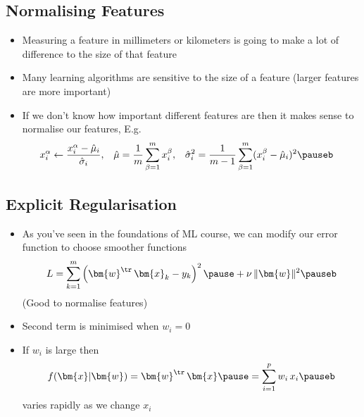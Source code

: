 
\begin{slide}
\section{Normalising Features}

\begin{PauseHighLight}
  \begin{itemize}
  \item Measuring a feature in millimeters or kilometers is going
    to make a lot of difference to the size of that feature\pause
  \item Many learning algorithms are sensitive to the size of a
    feature (larger features are more important)\pause
  \item If we don't know how important different features are then it
    makes sense to normalise our features\pause, E.g.
    \begin{align*}
      x^\alpha_i &\leftarrow \frac{x^\alpha_i-\hat{\mu}_i}{\hat{\sigma}_i},
      &
      \hat{\mu} &= \frac{1}{m} \sum_{\beta=1}^m x_i^\beta,
      &
      \hat{\sigma}_i^2 &= \frac{1}{m-1} \sum_{\beta=1}^m
                       (x_i^\beta-\hat{\mu}_i)^2\pauseb 
    \end{align*}
  \end{itemize}
\end{PauseHighLight}

\end{slide}




\Outline %

\begin{slide}
\section[-2]{Explicit Regularisation}

\begin{PauseHighLight}
  \begin{itemize}
  \item As you've seen in the foundations of ML course, we can modify
    our error function to choose smoother functions
    \begin{align*}
      L = \sum_{k=1}^m \left( \bm{w}^\tr \, \bm{x}_k - y_k \right)^2\pause
      + \nu \, \|\bm{w}\|^2\pauseb
    \end{align*}
    (Good to normalise features)\pauseb
  \item Second term is minimised when $w_i=0$\pause
  \item If $w_i$ is large then
    \begin{align*}
      f(\bm{x}|\bm{w})= \bm{w}^\tr \, \bm{x}\pause = \sum_{i=1}^p
      w_i \, x_{i}\pauseb
    \end{align*}
    varies rapidly as we change $x_i$\pause    
  \end{itemize}
\end{PauseHighLight}

\end{slide}

